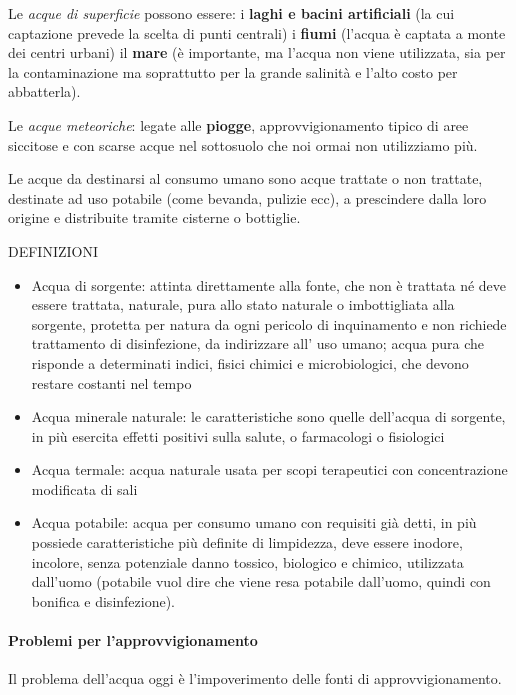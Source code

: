 Le \emph{acque di superficie} possono essere: i \textbf{laghi e bacini
artificiali} (la cui captazione prevede la scelta di punti centrali) i
\textbf{fiumi} (l'acqua è captata a monte dei centri urbani) il
\textbf{mare} (è importante, ma l'acqua non viene utilizzata, sia per la
contaminazione ma soprattutto per la grande salinità e l'alto costo per
abbatterla).

Le \emph{acque meteoriche}: legate alle \textbf{piogge},
approvvigionamento tipico di aree siccitose e con scarse acque nel
sottosuolo che noi ormai non utilizziamo più.

Le acque da destinarsi al consumo umano sono acque trattate o non
trattate, destinate ad uso potabile (come bevanda, pulizie ecc), a
prescindere dalla loro origine e distribuite tramite cisterne o
bottiglie.

DEFINIZIONI

\begin{itemize}
\item
  Acqua di sorgente: attinta direttamente alla fonte, che non è trattata
  né deve essere trattata, naturale, pura allo stato naturale o
  imbottigliata alla sorgente, protetta per natura da ogni pericolo di
  inquinamento e non richiede trattamento di disinfezione, da
  indirizzare all' uso umano; acqua pura che risponde a determinati
  indici, fisici chimici e microbiologici, che devono restare costanti
  nel tempo
\item
  Acqua minerale naturale: le caratteristiche sono quelle dell'acqua di
  sorgente, in più esercita effetti positivi sulla salute, o farmacologi
  o fisiologici
\item
  Acqua termale: acqua naturale usata per scopi terapeutici con
  concentrazione modificata di sali
\item
  Acqua potabile: acqua per consumo umano con requisiti già detti, in
  più possiede caratteristiche più definite di limpidezza, deve essere
  inodore, incolore, senza potenziale danno tossico, biologico e
  chimico, utilizzata dall'uomo (potabile vuol dire che viene resa
  potabile dall'uomo, quindi con bonifica e disinfezione).
\end{itemize}

\paragraph{Problemi per l'approvvigionamento}

Il problema dell'acqua oggi è l'impoverimento delle fonti di
approvvigionamento.

